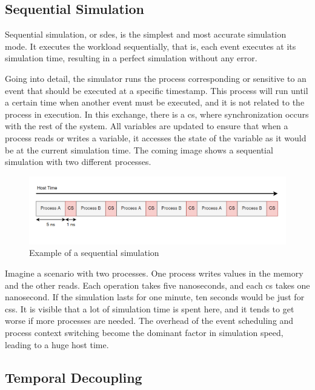 \subsection{Sequential Simulation}

Sequential simulation, or \gls{sdes}, is the simplest and most accurate simulation mode. It executes the workload sequentially, that is, each event 
executes at its simulation time, resulting in a perfect simulation without any error. 

Going into detail, the simulator runs the process corresponding or sensitive to an event that should be executed at a specific timestamp. This 
process will run until a certain time when another event must be executed, and it is not related to the process in execution. In this 
exchange, there is a \gls{cs}, where synchronization occurs with the rest of the system. All variables are updated to ensure that when a 
process reads or writes a variable, it accesses the state of the variable as it would be at the current simulation time. The coming image shows 
a sequential simulation with two different processes.

\begin{figure}[H]
	\centering
 	\includegraphics[width=0.8\linewidth]{Images/SequentialSimulation.png}
 	\caption{Example of a sequential simulation}
	 \label{fig_SequentialSimulation}
\end{figure}

Imagine a scenario with two processes. One process writes values in the memory and the other reads. Each operation takes five nanoseconds, 
and each \gls{cs} takes one nanosecond. If the simulation lasts for one minute, ten seconds would be just for \glspl{cs}. 
It is visible that a lot of simulation time is spent here, and it tends to get worse if more processes are needed. The overhead of the event 
scheduling and process context switching become the dominant factor in simulation speed, leading to a huge host time.

\subsection{Temporal Decoupling}

